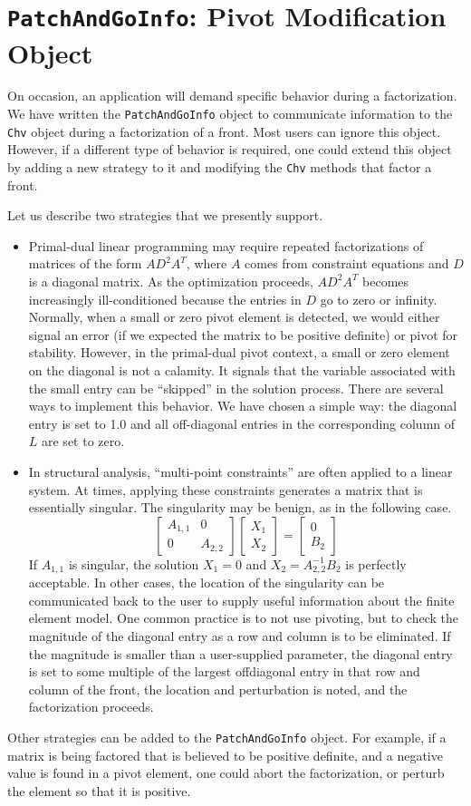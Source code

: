 \chapter{{\tt PatchAndGoInfo}: Pivot Modification Object}
\par
On occasion, an application will demand specific behavior 
during a factorization.
We have written the {\tt PatchAndGoInfo} object to communicate
information to the {\tt Chv} object during a factorization of a front.
Most users can ignore this object.
However, if a different type of behavior is required, one could
extend this object by adding a new strategy to it and modifying the
{\tt Chv} methods that factor a front.
\par
Let us describe two strategies that we presently support.
\begin{itemize}
\item
Primal-dual linear programming may require repeated factorizations
of matrices of the form $AD^2A^T$, where $A$ comes from constraint
equations and $D$ is a diagonal matrix.
As the optimization proceeds,
$AD^2A^T$ becomes increasingly ill-conditioned because the
entries in $D$ go to zero or infinity.
Normally, when a small or zero pivot element is detected, we would
either signal an error (if we expected the matrix to be positive
definite) or pivot for stability.
However, in the primal-dual pivot context, a small or zero element
on the diagonal is not a calamity.
It signals that the variable associated with the small entry can be
``skipped'' in the solution process.
There are several ways to implement this behavior.
We have chosen a simple way: the diagonal entry is set to 1.0
and all off-diagonal entries in the corresponding column of $L$
are set to zero.
\item
In structural analysis, ``multi-point constraints'' are often
applied to a linear system. At times, applying these constraints
generates a matrix that is essentially singular. The singularity
may be benign, as in the following case.
$$
\left \lbrack \begin{array}{cc}
A_{1,1} & 0 \\
0 & A_{2,2}
\end{array} \right \rbrack
\left \lbrack \begin{array}{c}
X_1 \\
X_2
\end{array} \right \rbrack
=
\left \lbrack \begin{array}{c}
0 \\
B_2
\end{array} \right \rbrack
$$
If $A_{1,1}$ is singular, the solution $X_1 = 0$ and
$X_2 = A_{2,2}^{-1} B_2$ is perfectly acceptable.
In other cases, the location of the singularity can be
communicated back to the user to supply useful information
about the finite element model.
One common practice is to not use pivoting, but to check the 
magnitude of the diagonal entry as a row and column is to be eliminated.
If the magnitude is smaller than a user-supplied parameter,
the diagonal entry is set to some multiple of the largest
offdiagonal entry in that row and column of the front,
the location and perturbation is noted, 
and the factorization proceeds.
\end{itemize}
\par
Other strategies can be added to the {\tt PatchAndGoInfo} object.
For example, if a matrix is being factored that is believed to be
positive definite, and a negative value is found in a pivot
element, one could abort the factorization, or perturb the element
so that it is positive.
